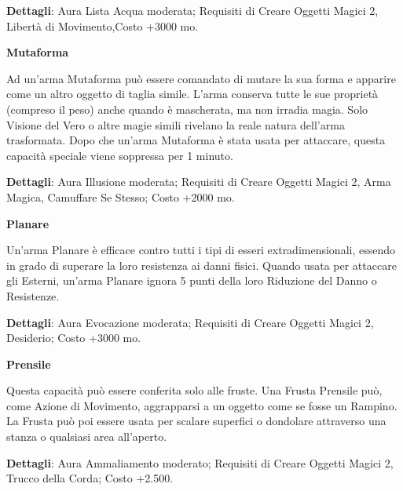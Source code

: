 \documentclass[a4paper,twoside,openany]{book}
\begin{document}
\textbf{Dettagli}: Aura Lista Acqua moderata; Requisiti di Creare Oggetti Magici 2, Libertà di Movimento,Costo +3000 mo.

\smallskip* \textbf{Mutaforma}\hypertarget{Armi Mutaforma}{}

Ad un'arma Mutaforma può essere comandato di mutare la sua forma e apparire come un altro oggetto di taglia simile. L'arma conserva tutte le sue proprietà (compreso il peso) anche quando è mascherata, ma non irradia magia. Solo Visione del Vero o altre magie simili rivelano la reale natura dell'arma trasformata. Dopo che un'arma Mutaforma è stata usata per attaccare, questa capacità speciale viene soppressa per 1 minuto.

\textbf{Dettagli}: Aura Illusione moderata; Requisiti di Creare Oggetti Magici 2, Arma Magica, Camuffare Se Stesso; Costo +2000 mo.

\smallskip* \textbf{Planare}\hypertarget{Planare}{}

Un'arma Planare è efficace contro tutti i tipi di esseri extradimensionali, essendo in grado di superare la loro resistenza ai danni fisici. Quando usata per attaccare gli Esterni, un'arma Planare ignora 5 punti della loro Riduzione del Danno o Resistenze.

\textbf{Dettagli}: Aura Evocazione moderata; Requisiti di Creare Oggetti Magici 2, Desiderio; Costo +3000 mo.

\smallskip* \textbf{Prensile}\hypertarget{Prensile}{}

Questa capacità può essere conferita solo alle fruste. Una Frusta Prensile può, come Azione di Movimento, aggrapparsi a un oggetto come se fosse un Rampino. La Frusta può poi essere usata per scalare superfici o dondolare attraverso una stanza o qualsiasi area all'aperto.

\textbf{Dettagli}: Aura Ammaliamento moderato; Requisiti di Creare Oggetti Magici 2, Trucco della Corda; Costo +2.500.


{\scriptsize\printindex}
\end{document}
